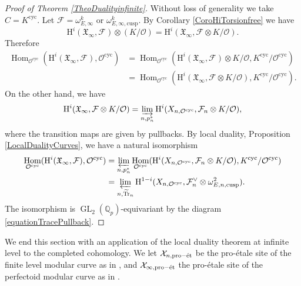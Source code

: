 \documentclass[11pt]{article}
\newcommand{\cusp}{\mathrm{cusp}}
\newcommand{\cyc}{\mathrm{cyc}}
\newcommand{\et}{\mathrm{\acute{e}t}}
\newcommand{\proet}{\mathrm{pro}\textup{-}\et}
\numberwithin{equation}{section}
\theoremstyle{definition}
\newcommand{\bb}[1]{\mathbb{#1}}
\newcommand{\n}[1]{\mathcal{#1}}
\newcommand{\f}[1]{\mathfrak{#1}}
\DeclareMathOperator{\GL}{GL}
\DeclareMathOperator{\Tr}{Tr}
\DeclareMathOperator{\Hom}{Hom}
\begin{document}
\begin{proof}[Proof of Theorem \ref{TheoDualityinfinite}]

Without loss of generality we take $C\!=\!K^{\cyc}$. Let $\n{F}\!=\!\omega_{E,\infty}^k$ or $\omega^{k}_{E,\infty, \cusp}$. By Corollary \ref{CoroHiTorsionfree} we have
\[
\mathrm{H}^i(\f{X}_{\infty}, \n{F})\otimes (K/ \n{O}) = \mathrm{H}^i(\f{X}_{\infty}, \n{F} \otimes K/ \n{O}).
\]
Therefore
\begin{align*}
\Hom_{\n{O}^{\cyc}}(\mathrm{H}^i(\f{X}_{\infty}, \n{F}), \n{O}^{\cyc}) & = \Hom_{\n{O}^{\cyc}}(\mathrm{H}^i(\f{X}_{\infty}, \n{F})\otimes K/ \n{O} , K^{\cyc}/\n{O}^{\cyc}) \\
							 & = \Hom_{\n{O}^{\cyc}}(\mathrm{H}^i(\f{X}_{\infty}, \n{F}\otimes K/ \n{O}) , K^{\cyc}/\n{O}^{\cyc}).
\end{align*}
On the other hand, we have
\[
\mathrm{H}^i(\f{X}_{\infty}, \n{F}\otimes K/ \n{O}) = \varinjlim_{n,p_n^*} \mathrm{H}^i(X_{n,\n{O}^{\cyc}}, \n{F}_n\otimes K/ \n{O}),
\]
where the transition maps are given by pullbacks. By local duality, Proposition \ref{LocalDualityCurves}, we have a natural isomorphism
\begin{align*}
\Hom_{\n{O}^{\cyc}}(\mathrm{H}^i(\f{X}_{\infty}, \n{F}), \n{O}^{\cyc}) & = \varprojlim_{n, p_n^*} \Hom_{\n{O}^{\cyc}}(\mathrm{H}^i(X_{n,\n{O}^{\cyc}}, \n{F}_n \otimes K/ \n{O}), K^{\cyc}/ \n{O}^{\cyc}) \\
					& = \varprojlim_{n, \widetilde{\Tr}_n} \mathrm{H}^{1-i}(X_{n,\n{O}^{\cyc}}, \n{F}_n^{\vee}\otimes \omega^2_{E,n,\cusp}).
\end{align*}
The isomorphism is $\GL_2(\bb{Q}_p)$-equivariant by the diagram \eqref{equationTracePullback}.
\end{proof}

We end this section with an application of the local duality theorem at infinite level to the completed cohomology. We let $\n{X}_{n,\proet}$ be the pro-étale site of the finite level modular curve as in \cite[\S 3]{MR3090230}, and $\n{X}_{\infty, \proet}$ the pro-étale site of the perfectoid modular curve as in \cite[Lect.\,8]{ScholzeWeinspadicgeometry}.
\end{document}
